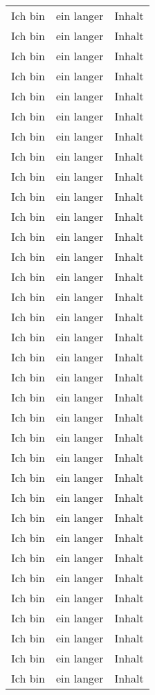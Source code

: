 \documentclass[
12pt,
ngerman
]{scrreprt}
\begin{document}
\begin{longtable}{lcl}
Ich bin & ein langer & Inhalt \\
Ich bin & ein langer & Inhalt \\
Ich bin & ein langer & Inhalt \\
Ich bin & ein langer & Inhalt \\
Ich bin & ein langer & Inhalt \\
Ich bin & ein langer & Inhalt \\
Ich bin & ein langer & Inhalt \\
Ich bin & ein langer & Inhalt \\
Ich bin & ein langer & Inhalt \\
Ich bin & ein langer & Inhalt \\
Ich bin & ein langer & Inhalt \\
Ich bin & ein langer & Inhalt \\
Ich bin & ein langer & Inhalt \\
Ich bin & ein langer & Inhalt \\
Ich bin & ein langer & Inhalt \\
Ich bin & ein langer & Inhalt \\
Ich bin & ein langer & Inhalt \\
Ich bin & ein langer & Inhalt \\
Ich bin & ein langer & Inhalt \\
Ich bin & ein langer & Inhalt \\
Ich bin & ein langer & Inhalt \\
Ich bin & ein langer & Inhalt \\
Ich bin & ein langer & Inhalt \\
Ich bin & ein langer & Inhalt \\
Ich bin & ein langer & Inhalt \\
Ich bin & ein langer & Inhalt \\
Ich bin & ein langer & Inhalt \\
Ich bin & ein langer & Inhalt \\
Ich bin & ein langer & Inhalt \\
Ich bin & ein langer & Inhalt \\
Ich bin & ein langer & Inhalt \\
Ich bin & ein langer & Inhalt \\
Ich bin & ein langer & Inhalt \\
Ich bin & ein langer & Inhalt \\
\end{longtable}
\end{document}
